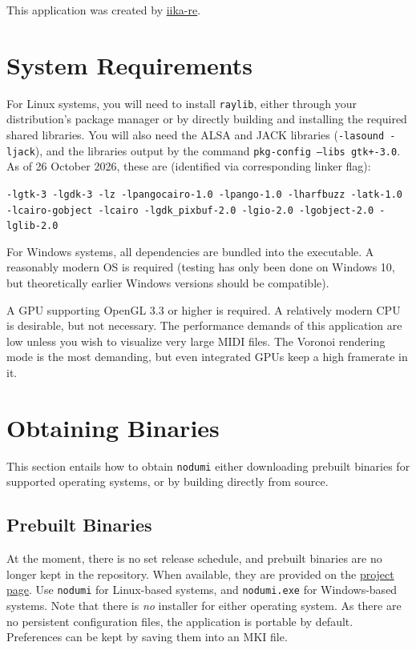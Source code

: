\documentclass[english]{article}
\makeatletter
\newenvironment{restoretext}%
    {\@parboxrestore%
     \begin{adjustwidth}{}{\leftmargin}%
    }{\end{adjustwidth}
     }
\def\rcbegin{\begin{restoretext}\centering}
\def\rcend{\end{restoretext}}
\providecommand{\mi}[1]{\texttt{#1}}
\makeatother
\begin{document}
This application was created by \textcolor{lcol}{\href{https://iika.re}{iika-re}}.

\section{System Requirements}

For Linux systems, you will need to install \mi{raylib}, either through your distribution's package manager or by directly
building and installing the required shared libraries.
You will also need the ALSA and JACK libraries (\mi{-lasound -ljack}), and the libraries output by the command
\mi{pkg-config --libs gtk+-3.0}. As of 26 October 2026, these are (identified via corresponding linker flag): 

\vspace{1em}

\rcbegin
  \mi{-lgtk-3 -lgdk-3 -lz -lpangocairo-1.0 -lpango-1.0 -lharfbuzz -latk-1.0
      -lcairo-gobject -lcairo -lgdk_pixbuf-2.0 -lgio-2.0 -lgobject-2.0 -lglib-2.0}
\rcend

\vspace{1em}

For Windows systems, all dependencies are bundled into the executable. A reasonably modern OS is required (testing has
only been done on Windows 10, but theoretically earlier Windows versions should be compatible).

A GPU supporting OpenGL 3.3 or higher is required. A relatively modern CPU is desirable, but not necessary.
The performance demands of this application are low unless you wish to visualize very large MIDI files.
The Voronoi rendering mode is the most demanding, but even integrated GPUs keep a high framerate in it.

\section{Obtaining Binaries}
\label{sec:obtain}

This section entails how to obtain \mi{nodumi} \textendash{} either downloading prebuilt binaries for supported operating systems,
or by building directly from source.

\subsection{Prebuilt Binaries}

At the moment, there is no set release schedule, and prebuilt binaries are no longer kept in the repository.
When available, they are provided on the \textcolor{lcol}{\href{https://iika.re/nodumi/}{project page}}.
Use \mi{nodumi} for Linux-based systems, and \mi{nodumi.exe} for Windows-based systems.
Note that there is \textit{no} installer for either operating system. As there are no persistent configuration files,
the application is portable by default. Preferences can be kept by saving them into an MKI file.
\end{document}
